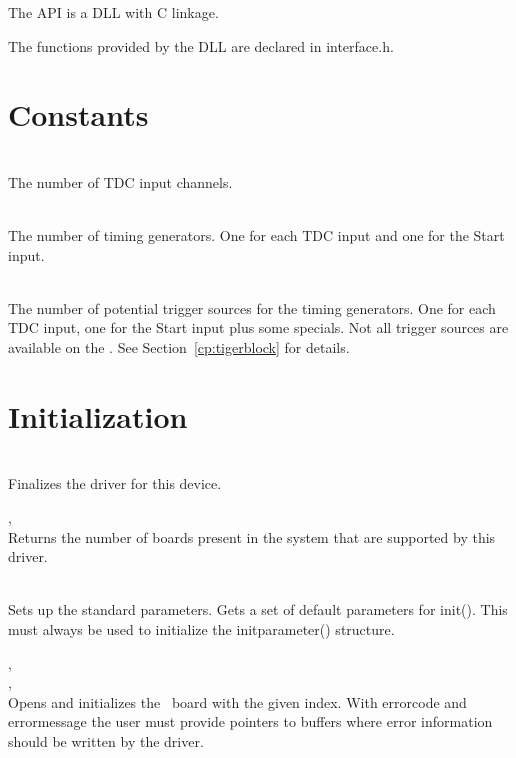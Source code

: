 The API is a DLL with C linkage.\par

The functions provided by the DLL are declared in \textsf{\tu interface.h}.

\section{Constants}

	\\
	The number of TDC input channels.\par

	 \\
	The number of timing generators. One for each TDC input and one for the Start input.\par

	 \\
	The number of potential trigger sources for the timing generators. One for each TDC input, one for the Start input plus some specials. 
	Not all trigger sources are available on the \deviceName . See Section~\ref{cp:tigerblock} for details.\par

\section{Initialization}
		\\
		Finalizes the driver for this device.

		, \\
		Returns the number of boards present in the system that are supported by this driver.\par

		\\
		Sets up the standard parameters. Gets a set of default parameters for \textsf{\prefix init()}. This must always be used to initialize the \textsf{\prefix init\tu parameter()} structure.\par

		, \\ , \\
		Opens and initializes the \deviceName\ board with the given index. 
		With \textsf{error\tu code} and \textsf{error\tu message} the user must provide pointers to buffers where error information should be written by the driver.\par

